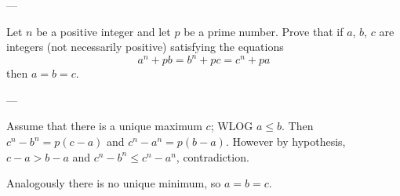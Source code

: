 
---

Let $n$ be a positive integer and let $p$ be a prime number. Prove that if $a$, $b$, $c$ are integers (not necessarily positive) satisfying the equations \[a^n+pb=b^n+pc=c^n+pa\]
then $a=b=c$.

---

Assume that there is a unique maximum $c$; WLOG $a\le b$. Then $c^n-b^n=p(c-a)$ and $c^n-a^n=p(b-a)$. However by hypothesis, $c-a>b-a$ and $c^n-b^n\le c^n-a^n$, contradiction.

Analogously there is no unique minimum, so $a=b=c$.

